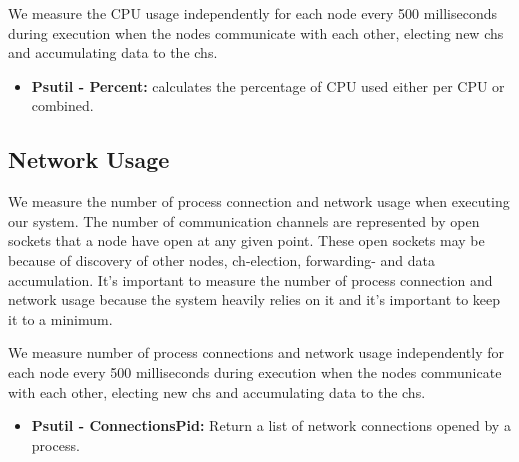 \documentclass[USenglish]{uit-thesis}
\begin{document}
We measure the CPU usage independently for each node every 500 milliseconds during execution when the nodes communicate with each other, electing new \glspl{ch} and accumulating data to the \glspl{ch}.

\begin{itemize}
\item \textbf{Psutil - Percent:} calculates the percentage of CPU used either per CPU or combined.
\end{itemize}



\subsection{Network Usage} \label{eva:net_measure}
We measure the number of process connection and network usage when executing our system. The number of communication channels are represented by open sockets that a node have open at any given point. These open sockets may be because of discovery of other nodes, \gls{ch}-election, forwarding- and data accumulation. It's important to measure the number of process connection and network usage because the system heavily relies on it and it's important to keep it to a minimum.


We measure number of process connections and network usage independently for each node every 500 milliseconds during execution when the nodes communicate with each other, electing new \glspl{ch} and accumulating data to the \glspl{ch}.

\begin{itemize}
\item \textbf{Psutil - ConnectionsPid:} Return a list of network connections opened by a process.
\end{itemize}


\end{document}

